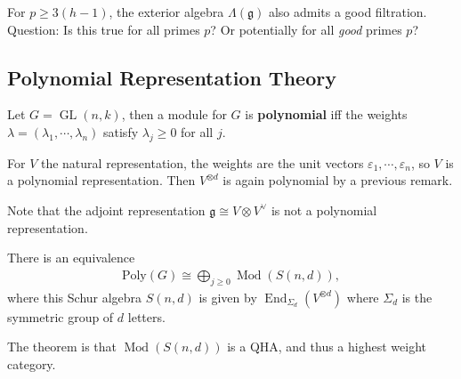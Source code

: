\begin{remark}

For \(p\geq 3(h-1)\), the exterior algebra \(\Lambda({\mathfrak{g}})\)
also admits a good filtration. Question: Is this true for all primes
\(p\)? Or potentially for all \emph{good} primes \(p\)?

\end{remark}

\hypertarget{polynomial-representation-theory}{%
\subsection{Polynomial Representation
Theory}\label{polynomial-representation-theory}}

Let \(G = \operatorname{GL}(n, k)\), then a module for \(G\) is
\textbf{polynomial} iff the weights
\(\lambda = (\lambda_1, \cdots, \lambda_n)\) satisfy
\(\lambda_j \geq 0\) for all \(j\).

\begin{example}

For \(V\) the natural representation, the weights are the unit vectors
\(\varepsilon_1, \cdots, \varepsilon_n\), so \(V\) is a polynomial
representation. Then \(V^{\otimes d}\) is again polynomial by a previous
remark.

\end{example}

\begin{remark}

Note that the adjoint representation
\({\mathfrak{g}}\cong V\otimes V^\vee\) is not a polynomial
representation.

\end{remark}

\begin{theorem}[?]

There is an equivalence
\begin{align*}  
\mathrm{Poly}(G) \cong \bigoplus_{j\geq 0} {\operatorname{Mod}}(S(n, d))
,\end{align*}
where this Schur algebra \(S(n, d)\) is given by
\(\operatorname{End}_{\Sigma_d}(V^{\otimes d})\) where \(\Sigma_d\) is
the symmetric group of \(d\) letters.

The theorem is that \({\operatorname{Mod}}(S(n, d))\) is a QHA, and thus
a highest weight category.

\end{theorem}

